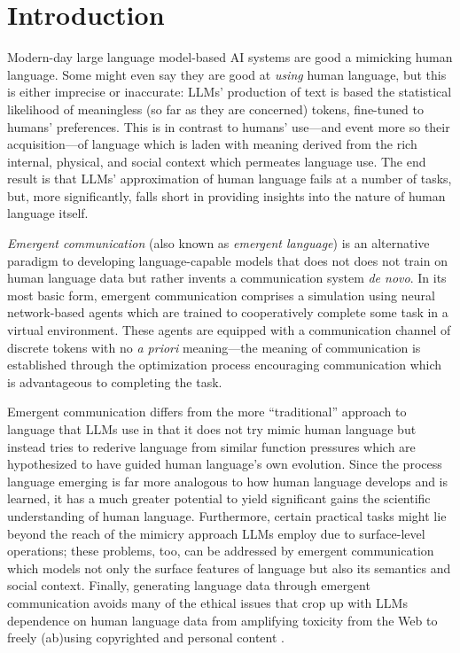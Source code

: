 \chapter{Introduction}

Modern-day large language model-based AI systems are good a mimicking human language.
Some might even say they are good at \emph{using} human language, but this is either imprecise or inaccurate:
  LLMs' production of text is based the statistical likelihood of meaningless (so far as they are concerned) tokens, fine-tuned to humans' preferences.
This is in contrast to humans' use---and event more so their acquisition---of language which is laden with meaning derived from the rich internal, physical, and social context which permeates language use.
The end result is that LLMs' approximation of human language fails at a number of tasks, but, more significantly, falls short in providing insights into the nature of human language itself.

\emph{Emergent communication} (also known as \emph{emergent language}) is an alternative paradigm to developing language-capable models that does not does not train on human language data but rather invents a communication system \emph{de novo}.
In its most basic form, emergent communication comprises a simulation using neural network-based agents which are trained to cooperatively complete some task in a virtual environment.
These agents are equipped with a communication channel of discrete tokens with no \emph{a priori} meaning---the meaning of communication is established through the optimization process encouraging communication which is advantageous to completing the task.

Emergent communication differs from the more ``traditional'' approach to language that LLMs use in that it does not try mimic human language but instead tries to rederive language from similar function pressures which are hypothesized to have guided human language's own evolution.
Since the process language emerging is far more analogous to how human language develops and is learned, it has a much greater potential to yield significant gains the scientific understanding of human language.
Furthermore, certain practical tasks might lie beyond the reach of the mimicry approach LLMs employ due to surface-level operations; these problems, too, can be addressed by emergent communication which models not only the surface features of language but also its semantics and social context.
Finally, generating language data through emergent communication avoids many of the ethical issues that crop up with LLMs dependence on human language data from amplifying toxicity from the Web to freely (ab)using copyrighted and personal content \citep{weidinger2021ethicalsocialrisksharm,carlini2021extractingtrainingdatalarge}.

